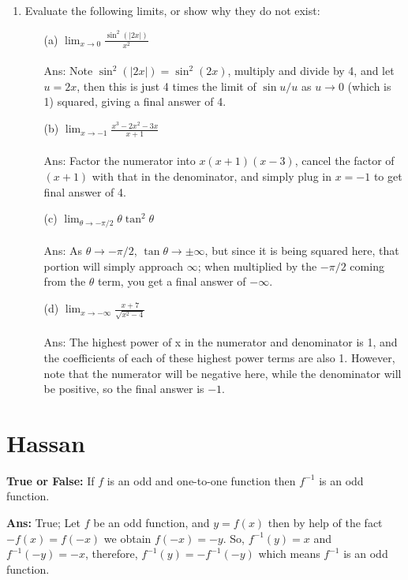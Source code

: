 \documentclass[11pt]{article}
\begin{document}
\begin{enumerate}
\item Evaluate the following limits, or show why they do not exist:
\begin{itemize}
\item[(a)] $\displaystyle\lim_{x\to 0} \frac{\sin^2\left(|2 x|\right)}{x^2}$\\
~\\
Ans: Note $\sin^2(|2x|)=\sin^2(2x)$, multiply and divide by 4, and let $u=2x$, then this is just 4 times the limit of $\sin u/u$ as $u\to 0$ (which is 1) squared, giving a final answer of 4.
\item[(b)] $\displaystyle\lim_{x\to -1} \frac{x^3-2x^2-3x}{x+1}$\\
~\\
Ans: Factor the numerator into $x(x+1)(x-3)$, cancel the factor of $(x+1)$ with that in the denominator, and simply plug in $x=-1$ to get final answer of 4.
\item[(c)] $\displaystyle\lim_{\theta\to -\pi/2}\theta\tan^2\theta$\\
~\\
Ans: As $\theta\to-\pi/2$, $\tan\theta\to\pm\infty$, but since it is being squared here, that portion will simply approach $\infty$; when multiplied by the $-\pi/2$ coming from the $\theta$ term, you get a final answer of $-\infty$.
\item[(d)] $\displaystyle\lim_{x\to -\infty} \frac{x+7}{\sqrt{x^2-4}}$\\
~\\
Ans:  The highest power of x in the numerator and denominator is 1, and the coefficients of each of these highest power terms are also 1.  However, note that the numerator will be negative here, while the denominator will be positive, so the final answer is $-1$.
\end{itemize}


\end{enumerate}


\section{Hassan}

{\bf True or False:} If $f$ is an odd and one-to-one function then $f^{-1}$ is an odd function.

{\bf Ans:} True; Let $f$ be an odd function, and $y=f(x)$ then by help of the fact $-f(x)=f(-x)$ we obtain $f(-x)=-y$. So, $f^{-1}(y)=x$ and $f^{-1}(-y)=-x$, therefore, $f^{-1}(y)=-f^{-1}(-y)$ which means $f^{-1}$ is an odd function.
\end{document}
